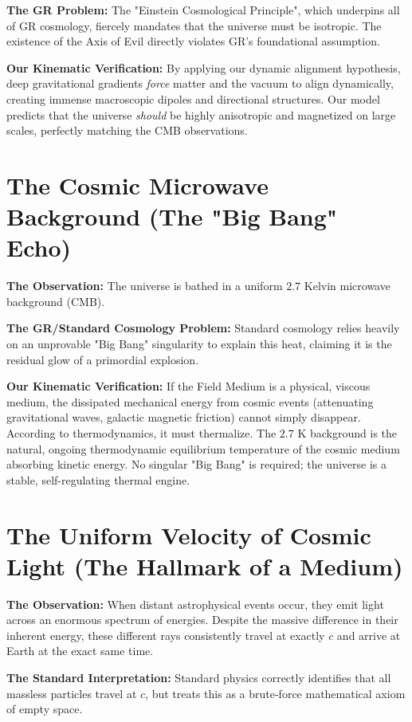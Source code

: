 \documentclass[reprint,amsmath,amssymb,aps,prd,twocolumn]{revtex4-2}
\begin{document}
\textbf{The GR Problem:} The "Einstein Cosmological Principle", which underpins all of GR cosmology, fiercely mandates that the universe must be isotropic. The existence of the Axis of Evil directly violates GR's foundational assumption.

\textbf{Our Kinematic Verification:} By applying our dynamic alignment hypothesis, deep gravitational gradients \textit{force} matter and the vacuum to align dynamically, creating immense macroscopic dipoles and directional structures. Our model predicts that the universe \textit{should} be highly anisotropic and magnetized on large scales, perfectly matching the CMB observations.

\section{The Cosmic Microwave Background (The "Big Bang" Echo)}
\textbf{The Observation:} The universe is bathed in a uniform $2.7$ Kelvin microwave background (CMB).

\textbf{The GR/Standard Cosmology Problem:} Standard cosmology relies heavily on an unprovable "Big Bang" singularity to explain this heat, claiming it is the residual glow of a primordial explosion.

\textbf{Our Kinematic Verification:} If the Field Medium is a physical, viscous medium, the dissipated mechanical energy from cosmic events (attenuating gravitational waves, galactic magnetic friction) cannot simply disappear. According to thermodynamics, it must thermalize. The $2.7$ K background is the natural, ongoing thermodynamic equilibrium temperature of the cosmic medium absorbing kinetic energy. No singular "Big Bang" is required; the universe is a stable, self-regulating thermal engine.

\section{The Uniform Velocity of Cosmic Light (The Hallmark of a Medium)}
\textbf{The Observation:} When distant astrophysical events occur, they emit light across an enormous spectrum of energies. Despite the massive difference in their inherent energy, these different rays consistently travel at exactly $c$ and arrive at Earth at the exact same time.

\textbf{The Standard Interpretation:} Standard physics correctly identifies that all massless particles travel at $c$, but treats this as a brute-force mathematical axiom of empty space.
\end{document}
